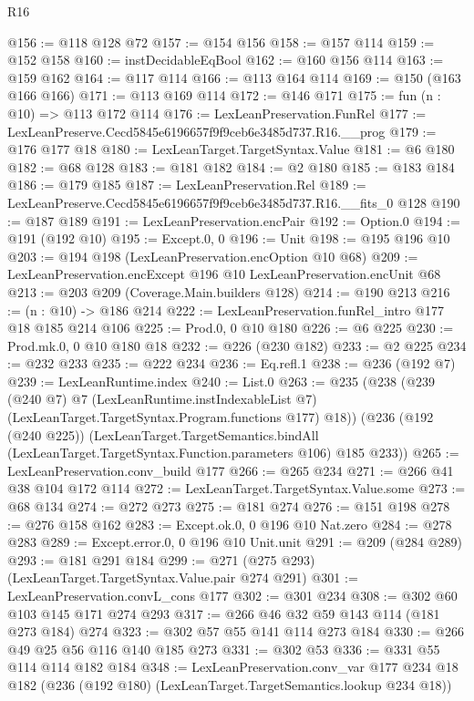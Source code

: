 \begin{lexlean}{R16}
\begin{coremodule}
@156 := @118 @128 @72
@157 := @154 @156
@158 := @157 @114
@159 := @152 @158
@160 := instDecidableEqBool
@162 := @160 @156 @114
@163 := @159 @162
@164 := @117 @114
@166 := @113 @164 @114
@169 := @150 (@163 @166 @166)
@171 := @113 @169 @114
@172 := @146 @171
@175 := fun (n : @10) => @113 @172 @114
@176 := LexLeanPreservation.FunRel
@177 := LexLeanPreserve.Cecd5845e6196657f9f9ceb6e3485d737.R16.__prog
@179 := @176 @177 @18
@180 := LexLeanTarget.TargetSyntax.Value
@181 := @6 @180
@182 := @68 @128
@183 := @181 @182
@184 := @2 @180
@185 := @183 @184
@186 := @179 @185
@187 := LexLeanPreservation.Rel
@189 := LexLeanPreserve.Cecd5845e6196657f9f9ceb6e3485d737.R16.__fits_0 @128
@190 := @187 @189
@191 := LexLeanPreservation.encPair
@192 := Option.{0}
@194 := @191 (@192 @10)
@195 := Except.{0, 0}
@196 := Unit
@198 := @195 @196 @10
@203 := @194 @198 (LexLeanPreservation.encOption @10 @68)
@209 := LexLeanPreservation.encExcept @196 @10 LexLeanPreservation.encUnit @68
@213 := @203 @209 (Coverage.Main.builders @128)
@214 := @190 @213
@216 := (n : @10) -> @186 @214
@222 := LexLeanPreservation.funRel_intro @177 @18 @185 @214 @106
@225 := Prod.{0, 0} @10 @180
@226 := @6 @225
@230 := Prod.mk.{0, 0} @10 @180 @18
@232 := @226 (@230 @182)
@233 := @2 @225
@234 := @232 @233
@235 := @222 @234
@236 := Eq.refl.{1}
@238 := @236 (@192 @7)
@239 := LexLeanRuntime.index
@240 := List.{0}
@263 := @235
    (@238
      (@239
        (@240 @7)
        @7
        (LexLeanRuntime.instIndexableList @7)
        (LexLeanTarget.TargetSyntax.Program.functions @177)
        @18))
    (@236
      (@192 (@240 @225))
      (LexLeanTarget.TargetSemantics.bindAll
        (LexLeanTarget.TargetSyntax.Function.parameters @106)
        @185
        @233))
@265 := LexLeanPreservation.conv_build @177
@266 := @265 @234
@271 := @266 @41 @38 @104 @172 @114
@272 := LexLeanTarget.TargetSyntax.Value.some
@273 := @68 @134
@274 := @272 @273
@275 := @181 @274
@276 := @151 @198
@278 := @276 @158 @162
@283 := Except.ok.{0, 0} @196 @10 Nat.zero
@284 := @278 @283
@289 := Except.error.{0, 0} @196 @10 Unit.unit
@291 := @209 (@284 @289)
@293 := @181 @291 @184
@299 := @271 (@275 @293) (LexLeanTarget.TargetSyntax.Value.pair @274 @291)
@301 := LexLeanPreservation.convL_cons @177
@302 := @301 @234
@308 := @302 @60 @103 @145 @171 @274 @293
@317 := @266 @46 @32 @59 @143 @114 (@181 @273 @184) @274
@323 := @302 @57 @55 @141 @114 @273 @184
@330 := @266 @49 @25 @56 @116 @140 @185 @273
@331 := @302 @53
@336 := @331 @55 @114 @114 @182 @184
@348 := LexLeanPreservation.conv_var
    @177
    @234
    @18
    @182
    (@236 (@192 @180) (LexLeanTarget.TargetSemantics.lookup @234 @18))

\end{coremodule}
\end{lexlean}
